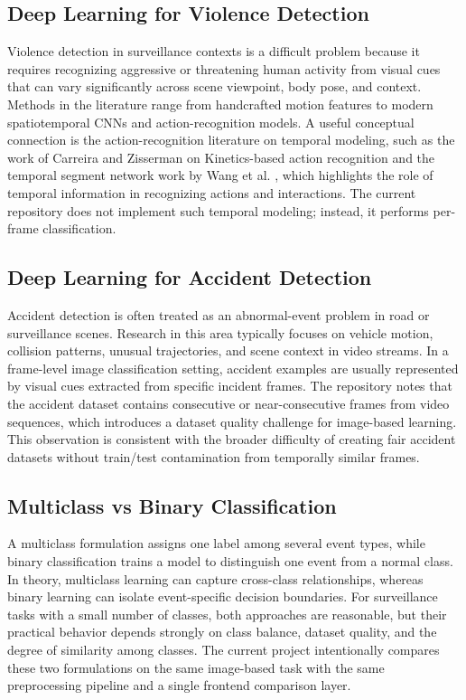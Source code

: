 \documentclass[11pt,a4paper]{article}
\begin{document}
\subsection{Deep Learning for Violence Detection}
Violence detection in surveillance contexts is a difficult problem because it requires recognizing aggressive or threatening human activity from visual cues that can vary significantly across scene viewpoint, body pose, and context. Methods in the literature range from handcrafted motion features to modern spatiotemporal CNNs and action-recognition models. A useful conceptual connection is the action-recognition literature on temporal modeling, such as the work of Carreira and Zisserman on Kinetics-based action recognition \cite{carreira2017} and the temporal segment network work by Wang et al. \cite{wang2016}, which highlights the role of temporal information in recognizing actions and interactions. The current repository does not implement such temporal modeling; instead, it performs per-frame classification.

\subsection{Deep Learning for Accident Detection}
Accident detection is often treated as an abnormal-event problem in road or surveillance scenes. Research in this area typically focuses on vehicle motion, collision patterns, unusual trajectories, and scene context in video streams. In a frame-level image classification setting, accident examples are usually represented by visual cues extracted from specific incident frames. The repository notes that the accident dataset contains consecutive or near-consecutive frames from video sequences, which introduces a dataset quality challenge for image-based learning. This observation is consistent with the broader difficulty of creating fair accident datasets without train/test contamination from temporally similar frames.

\subsection{Multiclass vs Binary Classification}
A multiclass formulation assigns one label among several event types, while binary classification trains a model to distinguish one event from a normal class. In theory, multiclass learning can capture cross-class relationships, whereas binary learning can isolate event-specific decision boundaries. For surveillance tasks with a small number of classes, both approaches are reasonable, but their practical behavior depends strongly on class balance, dataset quality, and the degree of similarity among classes. The current project intentionally compares these two formulations on the same image-based task with the same preprocessing pipeline and a single frontend comparison layer.
\end{document}
